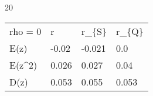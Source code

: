 
20
\begin{tabular}{llll}
\hline
 rho = 0 & r     & r\_\{S\}  & r\_\{Q\} \\
 E(z)    & -0.02 & -0.021 & 0.0   \\
 E(z\^{}2)  & 0.026 & 0.027  & 0.04  \\
 D(z)    & 0.053 & 0.055  & 0.053 \\
\hline
\end{tabular}